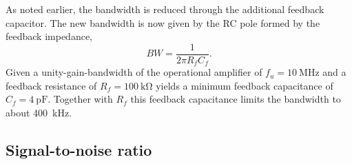 As noted earlier, the bandwidth is reduced through the additional feedback capacitor.
The new bandwidth is now given by the RC pole formed by the feedback impedance,
\begin{equation}
	BW=\frac{1}{2\pi R_fC_f}.
\end{equation}
Given a unity-gain-bandwidth of the operational amplifier of $f_u=\SI{10}{\mega\hertz}$ and a feedback resistance of $R_f=\SI{100}{\kilo\ohm}$  yields a minimum feedback capacitance of $C_f=\SI{4}{\pico\farad}$.
Together with $R_f$ this feedback capacitance limits the bandwidth to about \SI{400}{\kilo\hertz}.

\subsection{Signal-to-noise ratio}


